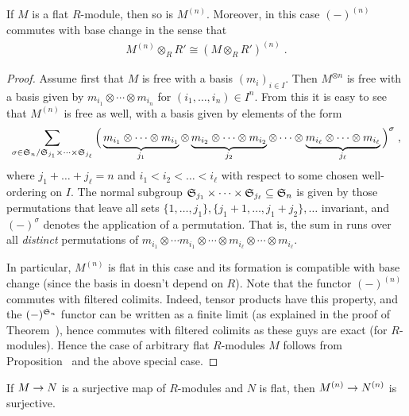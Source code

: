 \documentclass[a4paper,parskip=half,numbers=enddot, DIV=12]{scrreprt}
\begin{document}
\begin{cor}
	If $M$ is a flat $R$-module, then so is $M^{(n)}$. Moreover, in this case $(-)^{(n)}$ commutes with base change in the sense that
	\begin{align*}
		M^{(n)}\otimes_RR'\cong (M\otimes_RR')^{(n)}\;.
	\end{align*}
\end{cor}
\begin{proof}
	Assume first that $M$ is free with a basis $(m_i)_{i\in I}$. Then $M^{\otimes n}$ is free with a basis given by $m_{i_1}\otimes\cdots \otimes m_{i_n}$ for $(i_1,\ldots,i_n)\in I^n$. From this it is easy to see that $M^{(n)}$ is free as well, with a basis given by elements of the form
	\begin{align}\lbl{eq:HorrorBasis}
		\sum_{\sigma\in\SS_n/\SS_{j_1}\times\cdots\times\SS_{j_\ell}}\Big(\underbrace{m_{i_1}\otimes \cdots\otimes m_{i_1}}_{j_1}\otimes \underbrace{m_{i_2}\otimes\cdots\otimes m_{i_2}}_{j_2}\otimes\cdots \otimes \underbrace{m_{i_\ell}\otimes \cdots \otimes m_{i_\ell}}_{j_\ell}\Big)^\sigma\;,
	\end{align}
	where $j_1+\ldots+j_\ell=n$ and $i_1<i_2<\ldots <i_\ell$ with respect to some chosen well-ordering on $I$. The normal subgroup $\mathfrak{S}_{j_1}\times\cdots\times\mathfrak{S}_{j_\ell}\subseteq \mathfrak{S}_n$ is given by those permutations that leave all sets $\{1,\ldots,j_1\},\{j_1+1,\ldots,j_1+j_2\} ,\ldots$ invariant, and $(-)^\sigma$ denotes the application of a permutation. That is, the sum in  runs over all \emph{distinct} permutations of $m_{i_1}\otimes \cdots m_{i_1}\otimes\cdots\otimes m_{i_\ell}\otimes \cdots \otimes m_{i_\ell}$.
	
	In particular, $M^{(n)}$ is flat in this case and its formation is compatible with base change (since the basis in  doesn't depend on $R$). Note that the functor $(-)^{(n)}$ commutes with filtered colimits. Indeed, tensor products have this property, and the $(-)^{\mathfrak{S}_n}$ functor can be written as a finite limit (as explained in the proof of Theorem~), hence commutes with filtered colimits as these guys are exact (for $R$-modules). Hence the case of arbitrary flat $R$-modules $M$ follows from Proposition~ and the above special case.
\end{proof}
\begin{cor}
	If $M\morphism N$ is a surjective map of $R$-modules and $N$ is flat, then $M^{(n)}\morphism N^{(n)}$ is surjective.
\end{cor}
\end{document}
